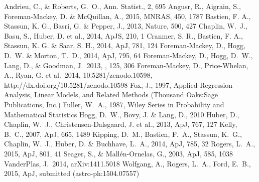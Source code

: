 \documentclass[apjl]{emulateapj}
\begin{document}
\begin{thebibliography}{99}
Andrieu, C., \& Roberts, G.~O., Ann. Statist., 2, 695
Angusr, R., Aigrain, S., Foreman-Mackey, D. \& McQuillan, A., 2015, MNRAS,
450, 1787
 Bastien,
F. A., Stassun, K. G., Basri, G. \& Pepper, J., 2013, Nature, 500, 427
Chaplin, W.~J., Basu, S., Huber, D. et al., 2014, ApJS, 210, 1
Cranmer, S. R., Bastien, F. A., Stassun, K. G. \& Saar, S. H., 2014, ApJ, 781,
124
 Foreman-Mackey, D., Hogg, D.~W. \& Morton, T.~D., 2014,
ApJ, 795, 64
Foreman-Mackey, D., Hogg, D.~W., Lang, D., \& Goodman, J.\ 2013, \pasp, 125, 306
Foreman-Mackey, D., Price-Whelan, A., Ryan, G. et al.\ 2014,
10.5281/zenodo.10598, http://dx.doi.org/10.5281/zenodo.10598
Fox, J., 1997, Applied Regression Analysis, Linear Models, and Related Methods
(Thousand Oaks:Sage Publications, Inc.)
Fuller, W.~A., 1987, Wiley Series in Probability and Mathematical Statistics
Hogg, D.~W., Bovy, J. \& Lang, D., 2010
Huber, D., Chaplin, W.~J., Christensen-Dalsgaard, J. et al., 2013, ApJ, 767,
127
 Kelly, B.~C., 2007,
ApJ, 665, 1489
Kipping, D.~M., Bastien, F.~A., Stassun, K.~G., Chaplin, W.~J., Huber, D. \&
Buchhave, L.~A., 2014, ApJ, 785, 32
Rogers, L.~A., 2015, ApJ, 801, 41
Seager, S., \& Mall\'{e}n-Ornelas, G., 2003, ApJ, 585, 1038
VanderPlas, J.\ 2014, arXiv:1411.5018
Wolfgang, A., Rogers, L.~A., Ford, E.~B., 2015, ApJ, submitted
(astro-ph:1504.07557)
\end{thebibliography}
\end{document}
